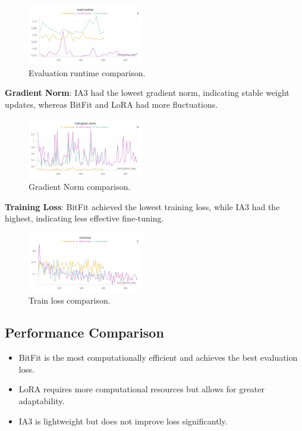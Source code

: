 \documentclass[11pt]{article}
\begin{document}
    \begin{figure}[H]
  \centering
  \includegraphics[width=0.45\textwidth]{images/3.eval_runtime.jpg}
  \caption{Evaluation runtime comparison.}
  \label{fig:results}
\end{figure}
\textbf{Gradient Norm}: IA3 had the lowest gradient norm, indicating stable weight updates, whereas BitFit and LoRA had more fluctuations.

    \begin{figure}[H]
  \centering
  \includegraphics[width=0.45\textwidth]{images/3.train_gradnorm.jpg}
  \caption{Gradient Norm comparison.}
  \label{fig:results}
\end{figure}
\textbf{Training Loss}: BitFit achieved the lowest training loss, while IA3 had the highest, indicating less effective fine-tuning.

        \begin{figure}[H]
  \centering
  \includegraphics[width=0.45\textwidth]{images/3.train_loss.jpg}
  \caption{Train loss comparison.}
  \label{fig:results}
\end{figure}

\subsection{Performance Comparison}
\begin{itemize}
    \item BitFit is the most computationally efficient and achieves the best evaluation loss.
    \item LoRA requires more computational resources but allows for greater adaptability.
    \item IA3 is lightweight but does not improve loss significantly.
\end{itemize}


\end{document}

